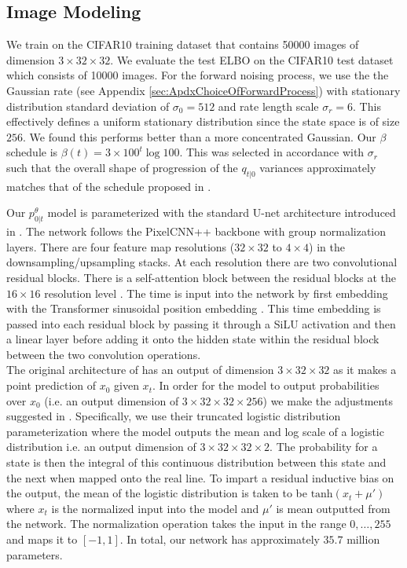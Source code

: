 \documentclass{article}
\begin{document}
\subsection{Image Modeling} \label{sec:ApdxCIFAR10Experiment}
We train on the CIFAR10 training dataset that contains 50000 images of dimension $3 \times 32 \times 32$. We evaluate the test ELBO on the  CIFAR10 test dataset which consists of 10000 images. For the forward noising process, we use the the Gaussian rate (see Appendix \ref{sec:ApdxChoiceOfForwardProcess}) with stationary distribution standard deviation of $\sigma_0 = 512$ and rate length scale $\sigma_r = 6$. This effectively defines a uniform stationary distribution since the state space is of size $256$. We found this performs better than a more concentrated Gaussian. Our $\beta$ schedule is $\beta(t) = 3 \times 100^t \log 100$. This was selected in accordance with $\sigma_r$ such that the overall shape of progression of the $q_{t|0}$ variances approximately matches that of the schedule proposed in \cite{ho2020denoising}.

Our $p_{0|t}^\theta$ model is parameterized with the standard U-net \cite{ronneberger2015u} architecture introduced in \cite{ho2020denoising}. The network follows the PixelCNN++ backbone \cite{salimans2017pixelcnn++} with group normalization layers. There are four feature map resolutions ($32 \times 32$ to $4 \times 4$) in the downsampling/upsampling stacks. At each resolution there are two convolutional residual blocks. There is a self-attention block between the residual blocks at the $16 \times 16$ resolution level \cite{chen2018pixelsnail}. The time is input into the network by first embedding with the Transformer sinusoidal position embedding \cite{vaswani2017attention}. This time embedding is passed into each residual block by passing it through a SiLU activation \cite{elfwing2018sigmoid} and then a linear layer before adding it onto the hidden state within the residual block between the two convolution operations.\\

The original architecture of \cite{ho2020denoising} has an output of dimension $3 \times 32 \times 32$ as it makes a point prediction of $x_0$ given $x_t$. In order for the model to output probabilities over $x_0$ (i.e. an output dimension of $3 \times 32 \times 32 \times 256$) we make the adjustments suggested in \cite{austin2021structured}. Specifically, we use their truncated logistic distribution parameterization where the model outputs the mean and log scale of a logistic distribution i.e. an output dimension of $3 \times 32 \times 32 \times 2$. The probability for a state is then the integral of this continuous distribution between this state and the next when mapped onto the real line. To impart a residual inductive bias on the output, the mean of the logistic distribution is taken to be $\text{tanh}(x_t + \mu')$ where $x_t$ is the normalized input into the model and $\mu'$ is mean outputted from the network. The normalization operation takes the input in the range $0, \dots, 255$ and maps it to $[-1, 1]$. In total, our network has approximately $35.7$ million parameters.\\
\end{document}
